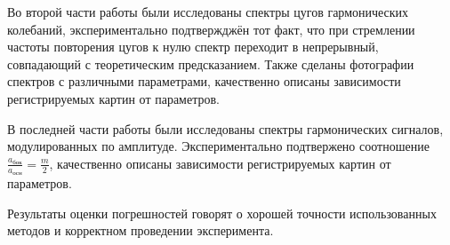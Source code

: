 \documentclass[a4paper,10pt]{article}
\begin{document}
Во второй части работы были исследованы спектры цугов гармонических колебаний, экспериментально подтвержджён тот факт, что при стремлении частоты повторения цугов к нулю спектр переходит в непрерывный, совпадающий с теоретическим предсказанием. Также сделаны фотографии спектров с различными параметрами, качественно описаны зависимости регистрируемых картин от параметров.

В последней части работы были исследованы спектры гармонических сигналов, модулированных по амплитуде. Экспериментально подтвержено соотношение $\frac{a_{\text{бок}}}{a_{\text{осн}}}=\frac{m}{2}$, качественно описаны зависимости регистрируемых картин от параметров.

Результаты оценки погрешностей говорят о хорошей точности использованных методов и корректном проведении эксперимента.
\end{document}
